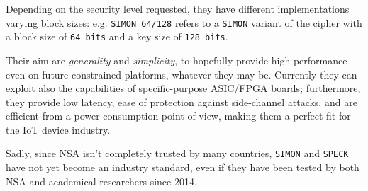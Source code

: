 Depending on the security level requested, they have different implementations varying block sizes:
e.g. \texttt{SIMON 64/128} refers to a \texttt{SIMON} variant of the cipher with a block size of \texttt{64 bits} and a key size of \texttt{128 bits}.

Their aim are \textit{generality} and \textit{simplicity},
to hopefully provide high performance even on future constrained platforms, whatever they may be.
Currently they can exploit also the capabilities of specific-purpose ASIC/FPGA boards;
furthermore, they provide low latency, ease of protection against side-channel attacks, and are efficient from a power consumption point-of-view,
making them a perfect fit for the IoT device industry.

Sadly, since NSA isn't completely trusted by many countries, \texttt{SIMON} and \texttt{SPECK} have not yet become an industry standard,
even if they have been tested by both NSA and academical researchers since 2014.

